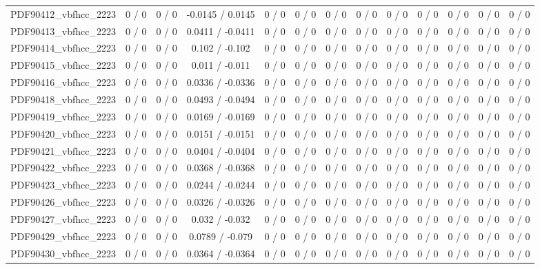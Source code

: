 \documentclass[10pt]{article}
\begin{document}
\begin{table}[htbp]
\begin{center}
\begin{tabular}{|c|c|c|c|c|c|c|c|c|c|c|c|c|}
  PDF90412_vbfhcc_2223 & 0 / 0 & 0 / 0 & -0.0145 / 0.0145 & 0 / 0 & 0 / 0 & 0 / 0 & 0 / 0 & 0 / 0 & 0 / 0 & 0 / 0 & 0 / 0 & 0 / 0 \\ 
  PDF90413_vbfhcc_2223 & 0 / 0 & 0 / 0 & 0.0411 / -0.0411 & 0 / 0 & 0 / 0 & 0 / 0 & 0 / 0 & 0 / 0 & 0 / 0 & 0 / 0 & 0 / 0 & 0 / 0 \\ 
  PDF90414_vbfhcc_2223 & 0 / 0 & 0 / 0 & 0.102 / -0.102 & 0 / 0 & 0 / 0 & 0 / 0 & 0 / 0 & 0 / 0 & 0 / 0 & 0 / 0 & 0 / 0 & 0 / 0 \\ 
  PDF90415_vbfhcc_2223 & 0 / 0 & 0 / 0 & 0.011 / -0.011 & 0 / 0 & 0 / 0 & 0 / 0 & 0 / 0 & 0 / 0 & 0 / 0 & 0 / 0 & 0 / 0 & 0 / 0 \\ 
  PDF90416_vbfhcc_2223 & 0 / 0 & 0 / 0 & 0.0336 / -0.0336 & 0 / 0 & 0 / 0 & 0 / 0 & 0 / 0 & 0 / 0 & 0 / 0 & 0 / 0 & 0 / 0 & 0 / 0 \\ 
  PDF90418_vbfhcc_2223 & 0 / 0 & 0 / 0 & 0.0493 / -0.0494 & 0 / 0 & 0 / 0 & 0 / 0 & 0 / 0 & 0 / 0 & 0 / 0 & 0 / 0 & 0 / 0 & 0 / 0 \\ 
  PDF90419_vbfhcc_2223 & 0 / 0 & 0 / 0 & 0.0169 / -0.0169 & 0 / 0 & 0 / 0 & 0 / 0 & 0 / 0 & 0 / 0 & 0 / 0 & 0 / 0 & 0 / 0 & 0 / 0 \\ 
  PDF90420_vbfhcc_2223 & 0 / 0 & 0 / 0 & 0.0151 / -0.0151 & 0 / 0 & 0 / 0 & 0 / 0 & 0 / 0 & 0 / 0 & 0 / 0 & 0 / 0 & 0 / 0 & 0 / 0 \\ 
  PDF90421_vbfhcc_2223 & 0 / 0 & 0 / 0 & 0.0404 / -0.0404 & 0 / 0 & 0 / 0 & 0 / 0 & 0 / 0 & 0 / 0 & 0 / 0 & 0 / 0 & 0 / 0 & 0 / 0 \\ 
  PDF90422_vbfhcc_2223 & 0 / 0 & 0 / 0 & 0.0368 / -0.0368 & 0 / 0 & 0 / 0 & 0 / 0 & 0 / 0 & 0 / 0 & 0 / 0 & 0 / 0 & 0 / 0 & 0 / 0 \\ 
  PDF90423_vbfhcc_2223 & 0 / 0 & 0 / 0 & 0.0244 / -0.0244 & 0 / 0 & 0 / 0 & 0 / 0 & 0 / 0 & 0 / 0 & 0 / 0 & 0 / 0 & 0 / 0 & 0 / 0 \\ 
  PDF90426_vbfhcc_2223 & 0 / 0 & 0 / 0 & 0.0326 / -0.0326 & 0 / 0 & 0 / 0 & 0 / 0 & 0 / 0 & 0 / 0 & 0 / 0 & 0 / 0 & 0 / 0 & 0 / 0 \\ 
  PDF90427_vbfhcc_2223 & 0 / 0 & 0 / 0 & 0.032 / -0.032 & 0 / 0 & 0 / 0 & 0 / 0 & 0 / 0 & 0 / 0 & 0 / 0 & 0 / 0 & 0 / 0 & 0 / 0 \\ 
  PDF90429_vbfhcc_2223 & 0 / 0 & 0 / 0 & 0.0789 / -0.079 & 0 / 0 & 0 / 0 & 0 / 0 & 0 / 0 & 0 / 0 & 0 / 0 & 0 / 0 & 0 / 0 & 0 / 0 \\ 
  PDF90430_vbfhcc_2223 & 0 / 0 & 0 / 0 & 0.0364 / -0.0364 & 0 / 0 & 0 / 0 & 0 / 0 & 0 / 0 & 0 / 0 & 0 / 0 & 0 / 0 & 0 / 0 & 0 / 0 \\ 

\end{tabular}
\end{center}
\end{table}
\end{document}
